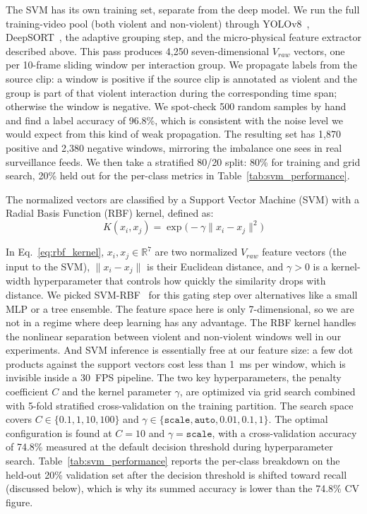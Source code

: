 \documentclass[conference]{IEEEtran}
\begin{document}
The SVM has its own training set, separate from the deep model. We run the full training-video pool (both violent and non-violent) through YOLOv8~\cite{jocher_yolov8_2023}, DeepSORT~\cite{wojke_simple_2017}, the adaptive grouping step, and the micro-physical feature extractor described above. This pass produces 4{,}250 seven-dimensional $V_{raw}$ vectors, one per 10-frame sliding window per interaction group. We propagate labels from the source clip: a window is positive if the source clip is annotated as violent and the group is part of that violent interaction during the corresponding time span; otherwise the window is negative. We spot-check 500 random samples by hand and find a label accuracy of 96.8\%, which is consistent with the noise level we would expect from this kind of weak propagation. The resulting set has 1{,}870 positive and 2{,}380 negative windows, mirroring the imbalance one sees in real surveillance feeds. We then take a stratified 80/20 split: 80\% for training and grid search, 20\% held out for the per-class metrics in Table~\ref{tab:svm_performance}.

The normalized vectors are classified by a Support Vector Machine (SVM) with a Radial Basis Function (RBF) kernel, defined as:
\begin{equation}
K(x_i, x_j) = \exp\bigl(-\gamma \|x_i - x_j\|^2\bigr)
\label{eq:rbf_kernel}
\end{equation}

\noindent In Eq.~\ref{eq:rbf_kernel}, $x_i, x_j \in \mathbb{R}^7$ are two normalized $V_{raw}$ feature vectors (the input to the SVM), $\|x_i - x_j\|$ is their Euclidean distance, and $\gamma > 0$ is a kernel-width hyperparameter that controls how quickly the similarity drops with distance. We picked SVM-RBF~\cite{cortes_svm_1995} for this gating step over alternatives like a small MLP or a tree ensemble. The feature space here is only 7-dimensional, so we are not in a regime where deep learning has any advantage. The RBF kernel handles the nonlinear separation between violent and non-violent windows well in our experiments. And SVM inference is essentially free at our feature size: a few dot products against the support vectors cost less than 1~ms per window, which is invisible inside a 30~FPS pipeline. The two key hyperparameters, the penalty coefficient $C$ and the kernel parameter $\gamma$, are optimized via grid search combined with 5-fold stratified cross-validation on the training partition. The search space covers $C \in \{0.1, 1, 10, 100\}$ and $\gamma \in \{\texttt{scale}, \texttt{auto}, 0.01, 0.1, 1\}$. The optimal configuration is found at $C = 10$
and $\gamma = \texttt{scale}$,
with a cross-validation accuracy of 74.8\% measured at the default decision threshold during hyperparameter search. Table~\ref{tab:svm_performance} reports the per-class breakdown on the held-out 20\% validation set after the decision threshold is shifted toward recall (discussed below), which is why its summed accuracy is lower than the 74.8\% CV figure.
\end{document}
